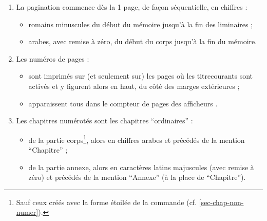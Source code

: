 \begin{enumerate}
\begin{itemize}
{      %
      S'il s'agit d'un chapitre dont les pages sont numérotées, la page
      d'ouverture contient néanmoins sont numéro en pied de page.%
    } ;
  \item de 4\ieme{} de couverture (et son recto).
  \end{itemize}
\item La \gls{pagination} commence dès la 1\iere{} page, de façon
  séquentielle, en chiffres :
  \begin{itemize}
  \item romains minuscules du début du mémoire jusqu'à la fin des
    \glspl{liminaire} ;
  \item arabes, avec remise à zéro, du début du corps jusqu'à la fin du
    mémoire.
  \end{itemize}
\item Les numéros de pages :
  \begin{itemize}
  \item sont imprimés sur (et seulement sur) les pages où les
    \glspl{titrecourant} sont activés et y figurent alors en haut, du côté des
    marges extérieures ;
  \item apparaissent tous dans le compteur de pages des afficheurs
    \pdf{}.
  \end{itemize}
\item Les chapitres numérotés sont les chapitres \enquote{ordinaires} :
  \begin{itemize}
  \item de la partie corps\footnote{Sauf ceux créés avec la forme étoilée de la
      commande  (cf. \vref{sec-chap-non-numer}).}, alors
    en chiffres arabes et précédés de la mention \enquote{Chapitre} ;
  \item de la partie annexe, alors en caractères latins majuscules (avec remise
    à zéro) et précédés de la mention \enquote{Annexe} (à la place de \enquote{Chapitre}).
  \end{itemize}
\end{enumerate}

